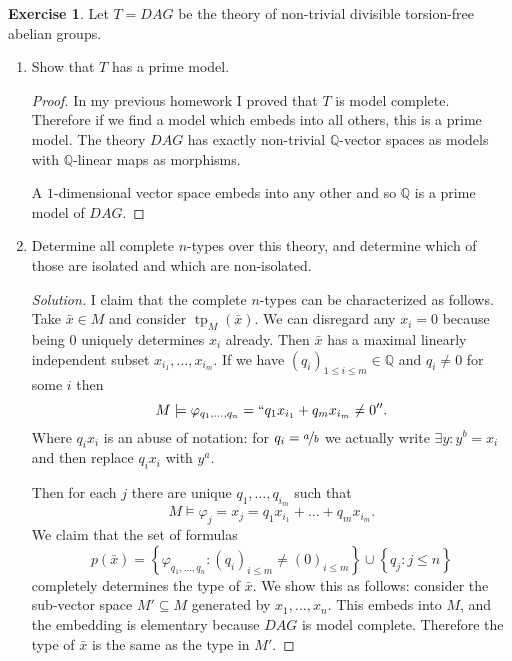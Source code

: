 \documentclass{article}
\renewcommand{\qedsymbol}{\raisebox{-0.5cm}{}}
\newcommand{\Q}{\mathbb{Q}}
\newcommand{\setwith}[2]{\left\{#1:#2\right\}}
\DeclareMathOperator{\type}{tp}
\newenvironment{solution}{\begin{proof}[Solution]\renewcommand\qedsymbol{}}{\end{proof}}
\theoremstyle{definition}
\newtheorem{question}{Exercise}
\begin{document}
\begin{question}
    Let \(T=DAG\) be the theory of non-trivial divisible torsion-free abelian
    groups.

    \begin{enumerate}[(1)]
        \item Show that \(T\) has a prime model.

              \begin{proof}
                  In my previous homework I proved that \(T\) is model complete.
                  Therefore if we find a model which embeds into all others,
                  this is a prime model. The theory \(DAG\) has exactly
                  non-trivial \(\Q\)-vector spaces as models with \(\Q\)-linear
                  maps as morphisms.

                  A \(1\)-dimensional vector space embeds into any other and so
                  \(\Q\) is a prime model of \(DAG\).
              \end{proof}

        \item Determine all complete \(n\)-types over this theory, and determine
              which of those are isolated and which are non-isolated.

              \begin{solution}
                  I claim that the complete \(n\)-types can be characterized as
                  follows. Take \(\bar{x}\in M\) and consider
                  \(\type_{M}(\bar{x})\). We can disregard any \(x_{i}=0\)
                  because being \(0\) uniquely determines \(x_{i}\) already.
                  Then \(\bar{x}\) has a maximal linearly independent subset
                  \(x_{i_{1}},\ldots,x_{i_{m}}\). If we have \((q_{i})_{1\leq
                          i\leq m}\in\Q\) and \(q_{i}\neq 0\) for some \(i\) then
                  \[
                      M\models\varphi_{q_{1},\ldots,q_{n}}=``q_{1}x_{i_{1}}+q_{m}x_{i_{m}}\neq 0''.
                  \]
                  Where \(q_{i}x_{i}\) is an abuse of notation: for
                  \(q_{i}=\nicefrac{a}{b}\) we actually write \(\exists
                  y:y^{b}=x_{i}\) and then replace \(q_{i}x_{i}\) with
                  \(y^{a}\).

                  Then for each \(j\) there are unique
                  \(q_{1},\ldots,q_{i_{m}}\) such that
                  \[
                      M\models\varphi_{j}=x_{j}=q_{1}x_{i_{1}}+\ldots+q_{m}x_{i_{m}}.
                  \]
                  We claim that the set of formulas
                  \[
                      p(\bar{x})=\setwith{\varphi_{q_{1},\ldots,q_{n}}}{(q_{i})_{i\leq m}\neq(0)_{i\leq m}}
                      \cup\setwith{q_{j}}{j\leq n}
                  \]
                  completely determines the type of \(\bar{x}\). We show this as
                  follows: consider the sub-vector space \(M'\subseteq M\)
                  generated by \(x_{1},\ldots,x_{n}\). This embeds into \(M\),
                  and the embedding is elementary because \(DAG\) is model
                  complete. Therefore the type of \(\bar{x}\) is the same as the
                  type in \(M'\).


\end{solution}
\end{enumerate}
\end{question}
\end{document}
